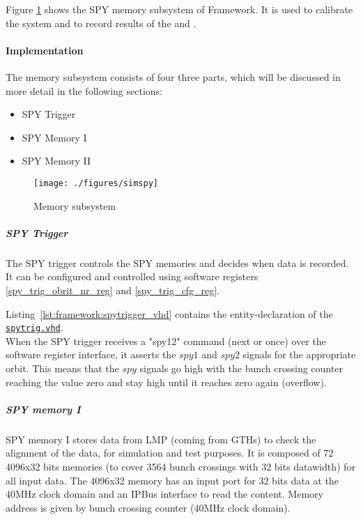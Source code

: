Figure \ref{fig_simspy} shows the SPY memory subsystem of Framework.
It is used to calibrate the system and to record results of the \ugtl and \ufdl.

\paragraph{Implementation}\label{sec:framework:spy_impl}
The memory subsystem consists of four three parts, which will be discussed in more detail in the following sections:

\begin{itemize}
\item SPY Trigger
\item SPY Memory I
\item SPY Memory II
\end{itemize}

\begin{figure}[h]
\texttt{[image: ./figures/simspy]}
\caption{Memory subsystem}
\label{fig_simspy}
\end{figure}

\subparagraph{SPY Trigger}\label{sec:framework:spy_trigger}
The SPY trigger controls the SPY memories and decides when data is recorded. It can be configured and controlled using software registers \ref{spy_trig_obrit_nr_reg} and \ref{spy_trig_cfg_reg}.

Listing~\ref{lst:framework:spytrigger_vhd} contains the entity-declaration of the \href{\gitbranch/firmware/hdl/payload/frame/spytrig.vhd}{\texttt{\textquotesingle spytrig.vhd\textquotesingle }}.\\



When the SPY trigger receives a "spy12" command (next or once) over the software register interface, it asserts the $spy1$ and $spy2$ signals for the appropriate orbit.
This means that the $spy$ signals go high with the bunch crossing counter reaching the value zero and stay high until it reaches zero again (overflow).

\subparagraph{SPY memory I}
SPY memory I stores data from LMP (coming from GTHs) to check the alignment of the data, for simulation and test purposes. It is composed of 72 4096x32 bits memories (to cover 3564 bunch crossings with 32 bits datawidth) for all input data. The 4096x32 memory has an input port for 32 bits data at the 40MHz clock domain and an IPBus interface to read the content. Memory address is given by bunch crossing counter (40MHz clock domain).

